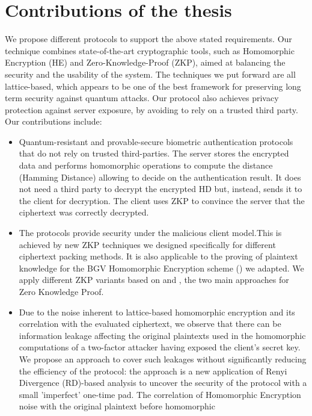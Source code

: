 \section{Contributions of the thesis}
\label{sec:thesisContributions}
We propose different protocols to support the above stated requirements. Our
technique combines state-of-the-art cryptographic tools, such as Homomorphic
Encryption (HE) and Zero-Knowledge-Proof (ZKP), aimed at balancing the security and the usability
of the system. The techniques we put forward are all lattice-based, which appears to be one of the best
framework for preserving long term security against quantum attacks. Our protocol also
achieves privacy protection against server exposure, by avoiding to rely on a trusted third
party. Our contributions include:
\begin{itemize}
\item Quantum-resistant and provable-secure biometric authentication protocols
  that do not rely on trusted third-parties. The server stores the encrypted data and performs
  homomorphic operations to compute the distance (Hamming Distance) allowing to decide on the
  authentication result. It does not need a third party to decrypt the encrypted
  HD but, instead, sends it to the client for decryption. The client uses ZKP to
  convince the server that the ciphertext was correctly decrypted.
\item The protocols provide security under the malicious client model.This is achieved
  by new ZKP techniques we designed specifically for different ciphertext
  packing methods. It is also applicable to the proving of plaintext knowledge for
  the BGV Homomorphic Encryption scheme (\cite{brakerski2011fully}) we
  adapted. We apply different ZKP variants based on \cite{stern1993new} and
  \cite{schnorr1989efficient}, the two main approaches for Zero
  Knowledge Proof.
\item Due to the noise inherent to lattice-based homomorphic encryption and
  its correlation with the evaluated ciphertext, we observe that there can be
  information leakage affecting the original plaintexts used in the homomorphic
  computations of a two-factor attacker having exposed the client's secret key. We
  propose an approach to cover such leakages without significantly reducing the
  efficiency of the protocol: the approach is a new application of Renyi
  Divergence (RD)-based analysis to uncover the security of the protocol with a
  small 'imperfect' one-time pad. The correlation of
  Homomorphic Encryption noise with the original plaintext before homomorphic

\end{itemize}

